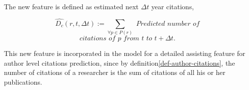 \begin{definition}
The new feature is defined as estimated next $\Delta t$ year citations,

\[\hat{D_c}(r,t,\Delta t):=\sum_{\forall p \in P(r)} \textit{ Predicted number of}\]
\[\textit{citations of } p \textit{ from } t \textit{ to } t+\Delta t.\]
\end{definition}

This new feature is incorporated in the model for a detailed assisting feature for author level citations prediction, since by definition\ref{def-author-citations}, the number of citations of a researcher is the sum of citations of all his or her publications.
